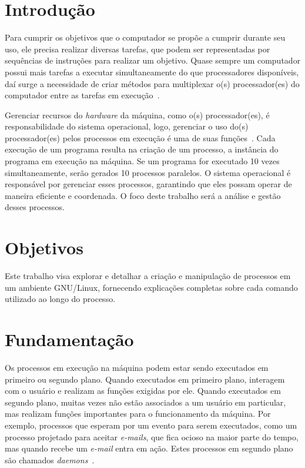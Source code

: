 \documentclass[
	12pt,				%
	oneside,   	        %
	a4paper,			%
	english,			%
	french,				%
	spanish,			%
	brazil,				%
	]{pacotes/abntex2}
\begin{document}
\makeatletter
\renewcommand{\chapter}{\@gobbletwo}
\makeatother

\section{Introdução}
\label{sec:introducao}
Para cumprir os objetivos que o computador se propõe a cumprir durante seu uso, ele precisa realizar diversas tarefas, que podem ser representadas por sequências de instruções para realizar um objetivo. Quase sempre um computador possui mais tarefas a executar simultaneamente do que processadores disponíveis, daí surge a necessidade de criar métodos para multiplexar o(s) processador(es) do computador entre as tarefas em execução~\cite{maziero2019}.

Gerenciar recursos do \textit{hardware} da máquina, como o(s) processador(es), é responsabilidade do sistema operacional, logo, gerenciar o uso do(s) processador(es) pelos processos em execução é uma de suas funções~\cite{tanenbaum2016}. Cada execução de um programa resulta na criação de um processo, a instância do programa em execução na máquina. Se um programa for executado 10 vezes simultaneamente, serão gerados 10 processos paralelos. O sistema operacional é responsável por gerenciar esses processos, garantindo que eles possam operar de maneira eficiente e coordenada. O foco deste trabalho será a análise e gestão desses processos.

\section{Objetivos}
\label{sec:objetivos}

Este trabalho visa explorar e detalhar a criação e manipulação de processos em um ambiente GNU/Linux, fornecendo explicações completas sobre cada comando utilizado ao longo do processo.

\section{Fundamentação}
\label{sec:fundamentacao}
Os processos em execução na máquina podem estar sendo executados em primeiro ou segundo plano. Quando executados em primeiro plano, interagem com o usuário e realizam as funções exigidas por ele. Quando executados em segundo plano, muitas vezes não estão associados a um usuário em particular, mas realizam funções importantes para o funcionamento da máquina. Por exemplo, processos que esperam por um evento para serem executados, como um processo projetado para aceitar \textit{e-mails}, que fica ocioso na maior parte do tempo, mas quando recebe um \textit{e-mail} entra em ação. Estes processos em segundo plano são chamados \textit{daemons}~\cite{tanenbaum2016}.
\end{document}
